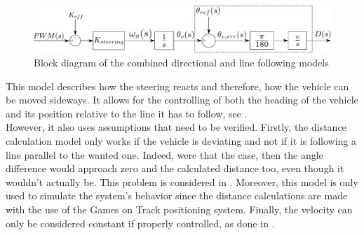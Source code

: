 \begin{figure}[H]
  \centering
  \includegraphics[width=1\textwidth]{figures/steeringModelWithLineFollowing.pdf}
  \caption{Block diagram of the combined directional and line following models}
  \label{fig:steeringLineFollowingModel}
\end{figure}

This model describes how the steering reacts and therefore, how the vehicle can be moved sideways. It allows for the controlling of both the heading of the vehicle and its position relative to the line it has to follow, see .\\
However, it also uses assumptions that need to be verified. Firstly, the distance calculation model only works if the vehicle is deviating and not if it is following a line parallel to the wanted one. Indeed, were that the case, then the angle difference would approach zero and the calculated distance too, even though it wouldn't actually be. This problem is considered in . Moreover, this model is only used to simulate the system's behavior since the distance calculations are made with the use of the Games on Track positioning system. Finally, the velocity can only be considered constant if properly controlled, as done in .